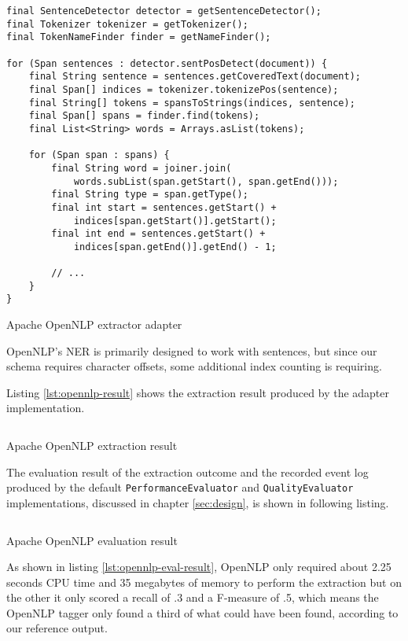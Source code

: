 \begin{listing}[H]
\begin{verbatim}
final SentenceDetector detector = getSentenceDetector();
final Tokenizer tokenizer = getTokenizer();
final TokenNameFinder finder = getNameFinder();

for (Span sentences : detector.sentPosDetect(document)) {
    final String sentence = sentences.getCoveredText(document);
    final Span[] indices = tokenizer.tokenizePos(sentence);
    final String[] tokens = spansToStrings(indices, sentence);
    final Span[] spans = finder.find(tokens);
    final List<String> words = Arrays.asList(tokens);

    for (Span span : spans) {
        final String word = joiner.join(
            words.subList(span.getStart(), span.getEnd()));
        final String type = span.getType();
        final int start = sentences.getStart() + 
            indices[span.getStart()].getStart();
        final int end = sentences.getStart() + 
            indices[span.getEnd()].getEnd() - 1;

        // ...
    }
}
\end{verbatim}
\caption{Apache OpenNLP extractor adapter}
\label{lst:opennlp-adapter}
\end{listing}

OpenNLP's \gls{NER} is primarily designed to work with sentences, but since our schema requires character offsets, some additional index counting is requiring.

\newpage
Listing \ref{lst:opennlp-result} shows the extraction result produced by the adapter implementation.

\begin{listing}[H]
\inputminted{xml}{opennlp.xml}
\caption{Apache OpenNLP extraction result}
\label{lst:opennlp-result}
\end{listing}

The evaluation result of the extraction outcome and the recorded event log produced by the default \texttt{PerformanceEvaluator} and \texttt{QualityEvaluator} implementations, discussed in chapter \ref{sec:design}, is shown in following listing.

\begin{listing}[H]
\inputminted{java}{opennlp.txt}
\caption{Apache OpenNLP evaluation result}
\label{lst:opennlp-eval-result}
\end{listing}

As shown in listing \ref{lst:opennlp-eval-result}, OpenNLP only required about 2.25 seconds CPU time and 35 megabytes of memory to perform the extraction but on the other it only scored a recall of .3 and a F-measure of .5, which means the OpenNLP tagger only found a third of what could have been found, according to our reference output.

